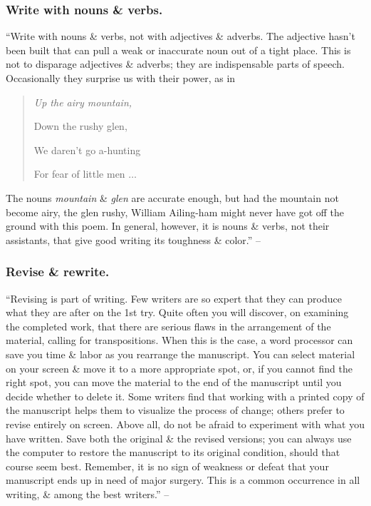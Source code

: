 \documentclass{article}
\begin{document}

\subsubsection{Write with nouns \& verbs.}
``Write with nouns \& verbs, not with adjectives \& adverbs. The adjective hasn't been built that can pull a weak or inaccurate noun out of a tight place. This is not to disparage adjectives \& adverbs; they are indispensable parts of speech. Occasionally they surprise us with their power, as in
\begin{quotation}\it
	Up the airy mountain,
	
	Down the rushy glen,
	
	We daren't go a-hunting
	
	For fear of little men $\ldots$
\end{quotation}
The nouns {\it mountain} \& {\it glen} are accurate enough, but had the mountain not become airy, the glen rushy, William Ailing-ham might never have got off the ground with this poem. In general, however, it is nouns \& verbs, not their assistants, that give good writing its toughness \& color.'' -- \cite[p. 81]{Strunk_White_element_style}


\subsubsection{Revise \& rewrite.}
``Revising is part of writing. Few writers are so expert that they can produce what they are after on the 1st try. Quite often you will discover, on examining the completed work, that there are serious flaws in the arrangement of the material, calling for transpositions. When this is the case, a word processor can save you time \& labor as you rearrange the manuscript. You can select material on your screen \& move it to a more appropriate spot, or, if you cannot find the right spot, you can move the material to the end of the manuscript until you decide whether to delete it. Some writers find that working with a printed copy of the manuscript helps them to visualize the process of change; others prefer to revise entirely on screen. Above all, do not be afraid to experiment with what you have written. Save both the original \& the revised versions; you can always use the computer to restore the manuscript to its original condition, should that course seem best. Remember, it is no sign of weakness or defeat that your manuscript ends up in need of major surgery. This is a common occurrence in all writing, \& among the best writers.'' -- \cite[p. 82]{Strunk_White_element_style}
\end{document}
